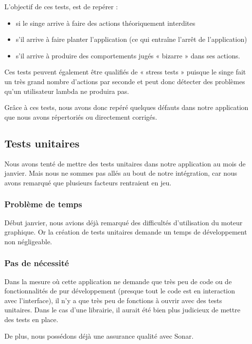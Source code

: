 \documentclass{report}
\begin{document}
L’objectif de ces tests, est de repérer :
\begin{itemize}
\item si le singe arrive à faire des actions théoriquement interdites
\item s’il arrive à faire planter l’application (ce qui entraîne l’arrêt
de l’application)
\item s’il arrive à produire des comportements jugés « bizarre » dans
ses actions.
\end{itemize}
Ces tests peuvent également être qualifiés de « stress tests » puisque
le singe fait un très grand nombre d’actions par seconde et peut donc
détecter des problèmes qu’un utilisateur lambda ne produira pas.

Grâce à ces tests, nous avons donc repéré quelques défauts dans notre
application que nous avons répertoriés ou directement corrigés.

\subsection{Tests unitaires}
\bigskip


Nous avons tenté de mettre des tests unitaires dans notre application
au mois de janvier. Mais nous ne sommes pas allés au bout de notre
intégration, car nous avons remarqué que plusieurs facteurs rentraient
en jeu.

\subsubsection{Problème de temps}

Début janvier, nous avions déjà remarqué des difficultés d’utilisation
du moteur graphique. Or la création de tests unitaires demande un temps
de développement non négligeable.

\subsubsection{Pas de nécessité}

Dans la mesure où cette application ne demande que très peu de code ou
de fonctionnalités de pur développement (presque tout le code est en
interaction avec l’interface), il n’y a que très peu de fonctions à
ouvrir avec des tests unitaires. Dans le cas d’une librairie, il aurait
été bien plus judicieux de mettre des tests en place.

De plus, nous possédons déjà une assurance qualité avec Sonar.
\end{document}
